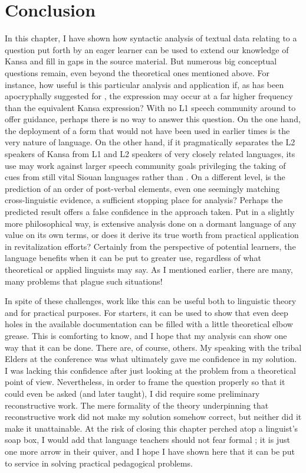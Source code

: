 \documentclass[output=paper]{LSP/langsci}
\begin{document}
\section{Conclusion}
	In this chapter, I have shown how syntactic analysis of textual data relating to a question put forth by an eager learner can be used to extend our knowledge of Kansa and fill in gaps in the source material. But numerous big conceptual questions remain, even beyond the theoretical ones mentioned above. For instance, how useful is this particular analysis and application if, as has been apocryphally suggested for , the  expression may occur at a far higher frequency than the equivalent Kansa expression? With no L1 speech community around to offer guidance, perhaps there is no way to answer this question. On the one hand, the deployment of a form that would not have been used in earlier times is the very nature of language. On the other hand, if it pragmatically separates the L2 speakers of Kansa from L1 and L2 speakers of very closely related languages, its use may work against larger speech community goals privileging the taking of cues from still vital Siouan languages rather than . On a different level, is the prediction of an order of post-verbal elements, even one seemingly matching cross-linguistic evidence, a sufficient stopping place for analysis? Perhaps the predicted result offers a false confidence in the approach taken. Put in a slightly more philosophical way, is extensive analysis done on a dormant language of any value on its own terms, or does it derive its true worth from practical application in revitalization efforts? Certainly from the perspective of potential learners, the language benefits when it can be put to greater use, regardless of what theoretical or applied linguists may say. As I mentioned earlier, there are many, many problems that plague such situations!
	
	In spite of these challenges, work like this can be useful both to linguistic theory and for practical purposes. For starters, it can be used to show that even deep holes in the available documentation can be filled with a little theoretical elbow grease. This is comforting to know, and I hope that my analysis can show one way that it can be done. There are, of course, others. My speaking with the tribal Elders at the conference was what ultimately gave me confidence in my solution. I was lacking this confidence after just looking at the problem from a theoretical point of view. Nevertheless, in order to frame the question properly so that it could even be asked (and later taught), I did require some preliminary reconstructive work. The mere formality of the theory underpinning that reconstructive work did not make my solution somehow correct, but neither did it make it unattainable. At the risk of closing this chapter perched atop a linguist's soap box, I would add that language teachers should not fear formal ; it is just one more arrow in their quiver, and I hope I have shown here that it can be put to service in solving practical pedagogical problems.
\end{document}
